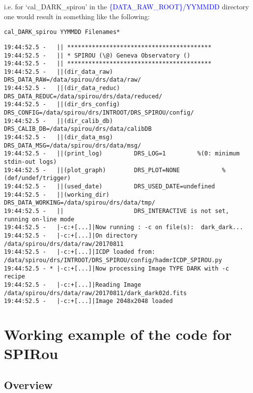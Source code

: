 \noindent i.e. for `cal\_DARK\_spirou' in the \textcolor{blue}{\{DATA\_RAW\_ROOT\}/YYMMDD} directory one would result in something like the following:
\begin{lstlisting}[style=bashstyle]
cal_DARK_spirou YYMMDD Filenames*
\end{lstlisting}
\begin{lstlisting}[style=bashstyle]
19:44:52.5 -   || *****************************************
19:44:52.5 -   || * SPIROU (\@) Geneva Observatory ()
19:44:52.5 -   || *****************************************
19:44:52.5 -   ||(dir_data_raw)      DRS_DATA_RAW=/data/spirou/drs/data/raw/
19:44:52.5 -   ||(dir_data_reduc)    DRS_DATA_REDUC=/data/spirou/drs/data/reduced/
19:44:52.5 -   ||(dir_drs_config)    DRS_CONFIG=/data/spirou/drs/INTROOT/DRS_SPIROU/config/
19:44:52.5 -   ||(dir_calib_db)      DRS_CALIB_DB=/data/spirou/drs/data/calibDB
19:44:52.5 -   ||(dir_data_msg)      DRS_DATA_MSG=/data/spirou/drs/data/msg/
19:44:52.5 -   ||(print_log)         DRS_LOG=1         %(0: minimum stdin-out logs)
19:44:52.5 -   ||(plot_graph)        DRS_PLOT=NONE            %(def/undef/trigger)
19:44:52.5 -   ||(used_date)         DRS_USED_DATE=undefined
19:44:52.5 -   ||(working_dir)       DRS_DATA_WORKING=/data/spirou/drs/data/tmp/
19:44:52.5 -   ||                    DRS_INTERACTIVE is not set, running on-line mode
19:44:52.5 -   |-c:+[...]|Now running : -c on file(s):  dark_dark...
19:44:52.5 -   |-c:+[...]|On directory /data/spirou/drs/data/raw/20170811
19:44:52.5 -   |-c:+[...]|ICDP loaded from: /data/spirou/drs/INTROOT/DRS_SPIROU/config/hadmrICDP_SPIROU.py
19:44:52.5 - * |-c:+[...]|Now processing Image TYPE DARK with -c recipe
19:44:52.5 -   |-c:+[...]|Reading Image /data/spirou/drs/data/raw/20170811/dark_dark02d.fits
19:44:52.5 -   |-c:+[...]|Image 2048x2048 loaded

\end{lstlisting}

\newpage
\section{Working example of the code for SPIRou}
\label{section:working_example}

\subsection{Overview}


